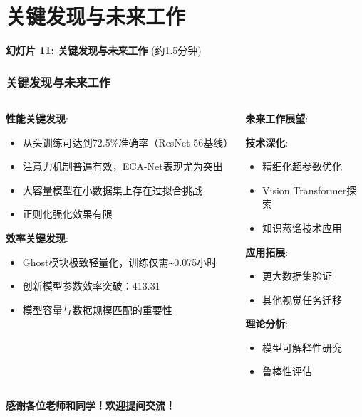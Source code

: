 \documentclass[10pt]{beamer}
\begin{document}
\section{关键发现与未来工作}
\begin{frame}{\textbf{幻灯片 11: 关键发现与未来工作} (约1.5分钟)}
\frametitle{关键发现与未来工作}

\begin{columns}[T]
    \begin{column}{0.5\textwidth}
        \textbf{性能关键发现}:
        \begin{itemize}
            \item 从头训练可达到72.5\%准确率（ResNet-56基线）
            \item 注意力机制普遍有效，ECA-Net表现尤为突出
            \item 大容量模型在小数据集上存在过拟合挑战
            \item 正则化强化效果有限
        \end{itemize}
        
        \vspace{0.5em}
        \textbf{效率关键发现}:
        \begin{itemize}
            \item Ghost模块极致轻量化，训练仅需\textasciitilde0.075小时
            \item 创新模型参数效率突破：413.31
            \item 模型容量与数据规模匹配的重要性
        \end{itemize}
    \end{column}
    \begin{column}{0.5\textwidth}
        \textbf{未来工作展望}:
        
        \textbf{技术深化}:
        \begin{itemize}
            \item 精细化超参数优化
            \item Vision Transformer探索
            \item 知识蒸馏技术应用
        \end{itemize}
        
        \textbf{应用拓展}:
        \begin{itemize}
            \item 更大数据集验证
            \item 其他视觉任务迁移
        \end{itemize}
        
        \textbf{理论分析}:
        \begin{itemize}
            \item 模型可解释性研究
            \item 鲁棒性评估
        \end{itemize}
    \end{column}
\end{columns}

\vspace{0.5em}
\centering
\textbf{感谢各位老师和同学！欢迎提问交流！}

\end{frame}
\end{document}
